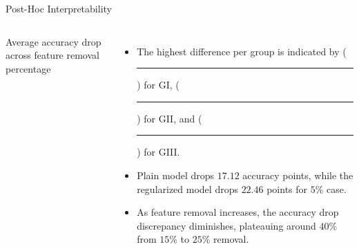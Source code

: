 \documentclass[aspectratio=169]{beamer}
\DeclareRobustCommand{\legend}[1]{%
	\textcolor{#1}{\rule{1ex}{2ex}}%
}
\begin{document}
\begin{frame}{Post-Hoc Interpretability}
    \begin{columns}
        Average accuracy drop across feature removal percentage
                \begin{table}[h!]
                    \centering
                    \end{table}

        \begin{itemize}
            \item The highest difference per group is indicated by (\legend{GI!80}) for GI, (\legend{GII!80}) for GII, and (\legend{GIII!80}) for GIII.
            \item Plain model drops $17.12$ accuracy points, while the regularized model drops $22.46$ points for $5\%$ case.
            \item As feature removal increases, the accuracy drop discrepancy diminishes, plateauing around $40\%$ from $15\%$ to $25\%$ removal.
        \end{itemize}
    \end{columns}  
\end{frame}
\end{document}
